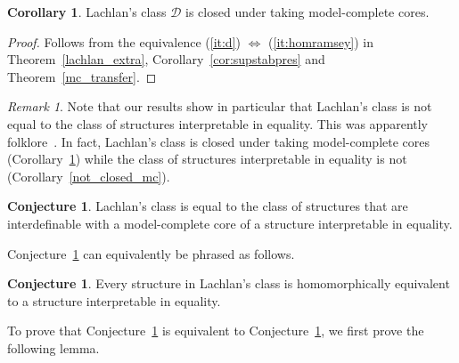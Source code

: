\documentclass{amsart}
\theoremstyle{definition}
\newtheorem{corollary}[theorem]{Corollary}
\newtheorem{conjecture}[theorem]{Conjecture}
\theoremstyle{remark}
\newtheorem{remark}[theorem]{Remark}
\numberwithin{equation}{section}
\begin{document}
\begin{corollary}\label{d_mc}
	Lachlan's class $\mathcal{D}$ is closed under taking model-complete cores.
\end{corollary}

\begin{proof}
	Follows from the equivalence (\ref{it:d}) $\Leftrightarrow$ (\ref{it:homramsey}) in Theorem~\ref{lachlan_extra}, Corollary~\ref{cor:supstabpres} and Theorem~\ref{mc_transfer}.
\end{proof}

\begin{remark}\label{rem:lachlans-strict}
Note that our results show in particular that Lachlan's class is not equal to the class of structures interpretable in  equality.
{This was apparently folklore~\cite{Blog}. In fact, Lachlan's class is closed under taking model-complete cores (Corollary~\ref{d_mc}) while the class of structures interpretable in  equality is not (Corollary~\ref{not_closed_mc}).}

\end{remark} 

\begin{conjecture}\label{conj:D}
    Lachlan's class is equal to the class of structures that are interdefinable with a model-complete core of a structure interpretable in  equality. 
\end{conjecture}

	Conjecture~\ref{conj:D} %
can equivalently be phrased as follows. 

\begin{conjecture}\label{conj:D2}
	Every structure in Lachlan's class is homomorphically equivalent to a structure interpretable in  equality. 
\end{conjecture}

To prove that Conjecture~\ref{conj:D2} is equivalent to Conjecture~\ref{conj:D}, we first prove the following lemma. 
\end{document}
